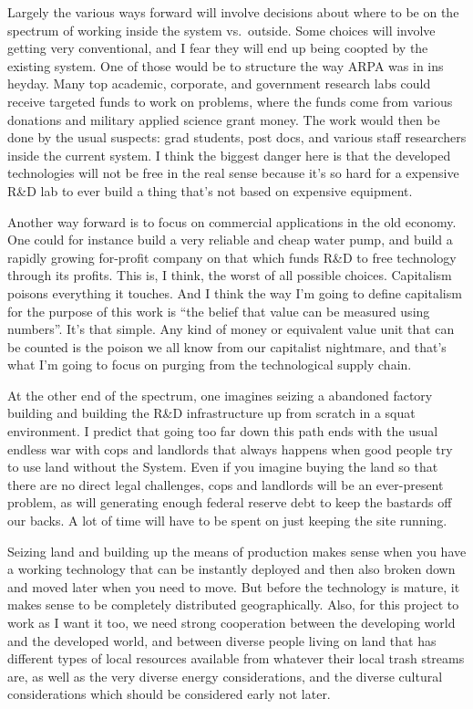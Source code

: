 Largely the various ways forward will involve decisions about where to
be on the spectrum of working inside the system vs.~outside. Some
choices will involve getting very conventional, and I fear they will end
up being coopted by the existing system. One of those would be to
structure the way ARPA was in ins heyday. Many top academic, corporate,
and government research labs could receive targeted funds to work on
problems, where the funds come from various donations and military
applied science grant money. The work would then be done by the usual
suspects: grad students, post docs, and various staff researchers inside
the current system. I think the biggest danger here is that the
developed technologies will not be free in the real sense because it's
so hard for a expensive R\&D lab to ever build a thing that's not based
on expensive equipment.

Another way forward is to focus on commercial applications in the old
economy. One could for instance build a very reliable and cheap water
pump, and build a rapidly growing for-profit company on that which funds
R\&D to free technology through its profits. This is, I think, the worst
of all possible choices. Capitalism poisons everything it touches. And I
think the way I'm going to define capitalism for the purpose of this
work is ``the belief that value can be measured using numbers''. It's
that simple. Any kind of money or equivalent value unit that can be
counted is the poison we all know from our capitalist nightmare, and
that's what I'm going to focus on purging from the technological supply
chain.

At the other end of the spectrum, one imagines seizing a abandoned
factory building and building the R\&D infrastructure up from scratch in
a squat environment. I predict that going too far down this path ends
with the usual endless war with cops and landlords that always happens
when good people try to use land without the System. Even if you imagine
buying the land so that there are no direct legal challenges, cops and
landlords will be an ever-present problem, as will generating enough
federal reserve debt to keep the bastards off our backs. A lot of time
will have to be spent on just keeping the site running.

Seizing land and building up the means of production makes sense when
you have a working technology that can be instantly deployed and then
also broken down and moved later when you need to move. But before the
technology is mature, it makes sense to be completely distributed
geographically. Also, for this project to work as I want it too, we need
strong cooperation between the developing world and the developed world,
and between diverse people living on land that has different types of
local resources available from whatever their local trash streams are,
as well as the very diverse energy considerations, and the diverse
cultural considerations which should be considered early not later.


